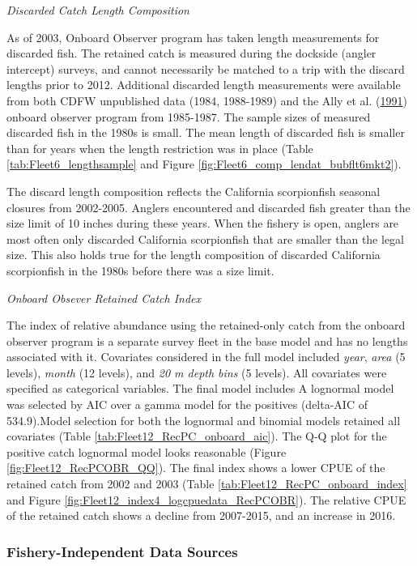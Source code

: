 \documentclass[12pt,]{article}
\begin{document}
\emph{Discarded Catch Length Composition}

As of 2003, Onboard Observer program has taken length measurements for
discarded fish. The retained catch is measured during the dockside
(angler intercept) surveys, and cannot necessarily be matched to a trip
with the discard lengths prior to 2012. Additional discarded length
measurements were available from both CDFW unpublished data (1984,
1988-1989) and the Ally et al. (\protect\hyperlink{ref-Ally1991}{1991})
onboard observer program from 1985-1987. The sample sizes of measured
discarded fish in the 1980s is small. The mean length of discarded fish
is smaller than for years when the length restriction was in place
(Table \ref{tab:Fleet6_lengthsample} and Figure
\ref{fig:Fleet6_comp_lendat_bubflt6mkt2}).

The discard length composition reflects the California scorpionfish
seasonal closures from 2002-2005. Anglers encountered and discarded fish
greater than the size limit of 10 inches during these years. When the
fishery is open, anglers are most often only discarded California
scorpionfish that are smaller than the legal size. This also holds true
for the length composition of discarded California scorpionfish in the
1980s before there was a size limit.

\emph{Onboard Obsever Retained Catch Index}

The index of relative abundance using the retained-only catch from the
onboard observer program is a separate survey fleet in the base model
and has no lengths associated with it. Covariates considered in the full
model included \emph{year}, \emph{area} (5 levels), \emph{month} (12
levels), and \emph{20 m depth bins} (5 levels). All covariates were
specified as categorical variables. The final model includes A lognormal
model was selected by AIC over a gamma model for the positives
(delta-AIC of 534.9).Model selection for both the lognormal and binomial
models retained all covariates (Table
\ref{tab:Fleet12_RecPC_onboard_aic}). The Q-Q plot for the positive
catch lognormal model looks reasonable (Figure
\ref{fig:Fleet12_RecPCOBR_QQ}). The final index shows a lower CPUE of
the retained catch from 2002 and 2003 (Table
\ref{tab:Fleet12_RecPC_onboard_index} and Figure
\ref{fig:Fleet12_index4_logcpuedata_RecPCOBR}). The relative CPUE of the
retained catch shows a decline from 2007-2015, and an increase in 2016.

\subsubsection{Fishery-Independent Data
Sources}\label{fishery-independent-data-sources}
\end{document}
